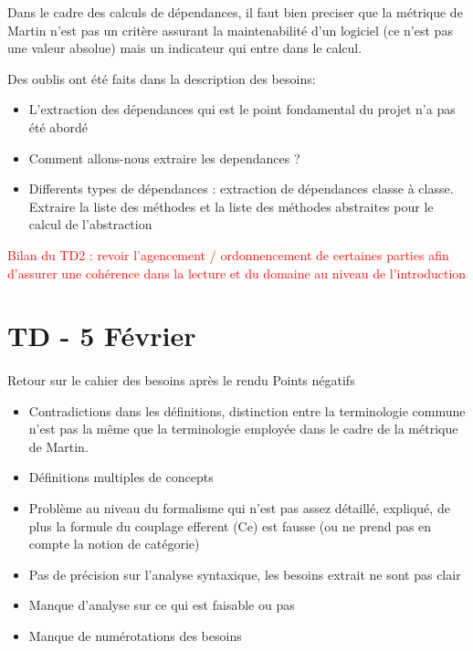 \documentclass{scrartcl}
\begin{document}
Dans le cadre des calculs de dépendances, il faut bien preciser que la métrique de Martin n'est pas un critère assurant la maintenabilité d'un logiciel (ce n'est pas une valeur absolue) mais un indicateur qui entre dans le calcul.

Des oublis ont été faits dans la description des besoins:
\begin{itemize}
    \item L'extraction des dépendances qui est le point fondamental du projet n'a pas été abordé
    \item Comment allons-nous extraire les dependances ?
    \item Differents types de dépendances : extraction de dépendances classe à classe. Extraire la liste des méthodes et la liste des méthodes abstraites pour le calcul de l'abstraction
\end{itemize}

\textcolor{red}{Bilan du TD2 : revoir l'agencement / ordonnencement de certaines parties afin d'assurer une cohérence dans la lecture et du domaine au niveau de l'introduction}


\section{TD - 5 Février}
\paragraph{}Retour sur le cahier des besoins après le rendu
\newline
Points négatifs
\begin{itemize}
    \item Contradictions dans les définitions, distinction entre la terminologie commune n'est pas la même que la terminologie employée dans le cadre de la métrique de Martin.
    \item Définitions multiples de concepts
    \item Problème au niveau du formalisme qui n'est pas assez détaillé, expliqué, de plus la formule du couplage efferent (Ce) est fausse (ou ne prend pas en compte la notion de catégorie)
    \item Pas de précision sur l'analyse syntaxique, les besoins extrait ne sont pas clair
    \item Manque d'analyse sur ce qui est faisable ou pas
    \item Manque de numérotations des besoins
\end{itemize}
\end{document}

